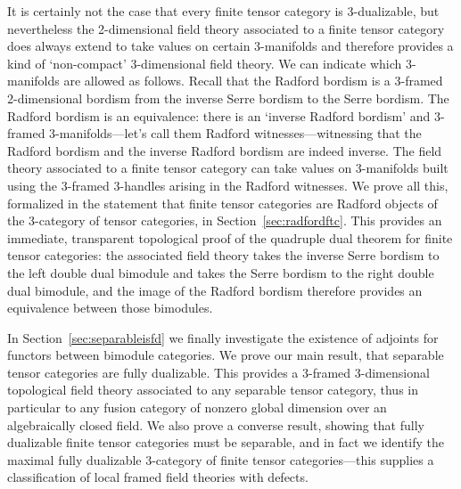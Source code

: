 \documentclass{amsart}
\begin{document}
It is certainly not the case that every finite tensor category is 3-dualizable, but nevertheless the 2-dimensional field theory associated to a finite tensor category does always extend to take values on certain 3-manifolds and therefore provides a kind of `non-compact' 3-dimensional field theory.  We can indicate which 3-manifolds are allowed as follows.  Recall that the Radford bordism is a 3-framed 2-dimensional bordism from the inverse Serre bordism to the Serre bordism.  The Radford bordism is an equivalence: there is an `inverse Radford bordism' and 3-framed 3-manifolds---let's call them Radford witnesses---witnessing that the Radford bordism and the inverse Radford bordism are indeed inverse.  The field theory associated to a finite tensor category can take values on 3-manifolds built using the 3-framed 3-handles arising in the Radford witnesses.  We prove all this, formalized in the statement that finite tensor categories are Radford objects of the 3-category of tensor categories, in Section~\ref{sec:radfordftc}.  This provides an immediate, transparent topological proof of the quadruple dual theorem for finite tensor categories: the associated field theory takes the inverse Serre bordism to the left double dual bimodule and takes the Serre bordism to the right double dual bimodule, and the image of the Radford bordism therefore provides an equivalence between those bimodules.

In Section~\ref{sec:separableisfd} we finally investigate the existence of adjoints for functors between bimodule categories.  We prove our main result, that separable tensor categories are fully dualizable.  This provides a 3-framed 3-dimensional topological field theory associated to any separable tensor category, thus in particular to any fusion category of nonzero global dimension over an algebraically closed field.  We also prove a converse result, showing that fully dualizable finite tensor categories must be separable, and in fact we identify the maximal fully dualizable 3-category of finite tensor categories---this supplies a classification of local framed field theories with defects.
\end{document}
